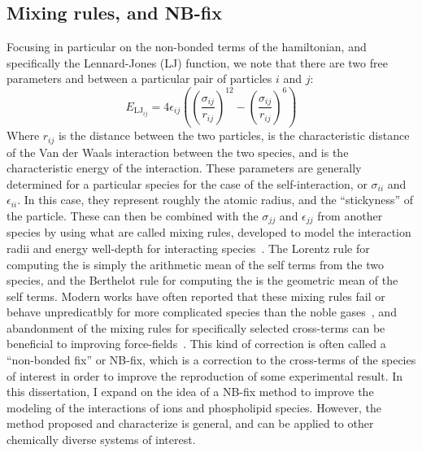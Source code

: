 \subsection{Mixing rules, and NB-fix}
Focusing in particular on the non-bonded terms of the hamiltonian, and specifically the Lennard-Jones (LJ) function, we note that there are two
free parameters \sigmaij{} and \epsilonij{} between a particular pair of particles $i$ and $j$:
\begin{equation}
E_{\mathrm{LJ}_{ij}} = 4\epsilon_{ij} \left( \left( \frac{\sigma_{ij}}{r_{ij}} \right)^{12}
- \left( \frac{\sigma_{ij}}{r_{ij}} \right)^{6} \right)
\end{equation}
Where $r_{ij}$ is the distance between the two particles, \sigmaij{} is the characteristic distance of the Van der Waals interaction between the two species,
and \epsilonij{} is the characteristic energy of the interaction.
These parameters are generally determined for a particular species for the case of the self-interaction, or $\sigma_{ii}$ and $\epsilon_{ii}$.
In this case, they represent roughly the atomic radius, and the ``stickyness'' of the particle. These can then be combined with the 
$\sigma_{jj}$ and $\epsilon_{jj}$ from another species by using what are called mixing rules, developed to 
model the interaction radii and energy well-depth for interacting species~\cite{lorentz:1881,berthelot:1898}.
The Lorentz rule for computing the \sigmaij{} is simply the arithmetic mean of the self terms from the two species, and 
the Berthelot rule for computing the \epsilonij{} is the geometric mean of the self terms.
Modern works have often reported that these mixing rules fail
or behave unpredicatbly for more complicated species than the noble gases~\cite{fyta:2012,boda:2008:effects},
and abandonment of the mixing rules for specifically selected cross-terms can be beneficial to improving
force-fields~\cite{baker:2010:accurate,yoo:2012:improved,fyta:2012:ionic,mamatkulov:2013:force,venable:2013,
savelyev:2014:balancing,li:2015:representation,savelyev:2015:competition,jing:2017:study,reif:2017,wineman:2019}. This 
kind of correction is often called a ``non-bonded fix'' or NB-fix, which is a correction to the cross-terms of the species of interest 
in order to improve the reproduction of some experimental result.
In this dissertation, I expand on the idea of a NB-fix method to improve the modeling of the interactions of ions and phospholipid species.
However, the method proposed and characterize is general, and can be applied to other chemically diverse systems of interest.


